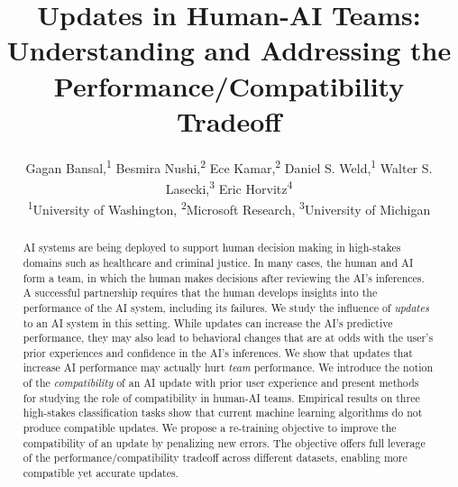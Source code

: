 \documentclass[letterpaper]{article} %
\title{Updates in Human-AI Teams:\\ Understanding and Addressing the Performance/Compatibility Tradeoff}
\author{
Gagan Bansal,\textsuperscript{\rm 1}
Besmira Nushi,\textsuperscript{\rm 2}
Ece Kamar,\textsuperscript{\rm 2}
Daniel S. Weld,\textsuperscript{\rm 1}
Walter S. Lasecki,\textsuperscript{\rm 3}
Eric Horvitz\textsuperscript{\rm 4}\\
\textsuperscript{\rm 1}University of Washington,
\textsuperscript{\rm 2}Microsoft Research,
\textsuperscript{\rm 3}University of Michigan
}
\newcommand{\?}{\mbox{?}}
\begin{document}
\maketitle

\begin{abstract}

AI systems are being deployed to support human decision making in high-stakes domains such as healthcare and criminal justice. In many cases, the human and AI form a team, in which the human makes decisions after reviewing the AI's inferences. A successful partnership requires that the human develops insights into the performance of the AI system, including its failures. We study the influence of {\em updates} to an AI system in this setting. While updates can increase the AI's predictive performance, they may also lead to behavioral changes that are at odds with the user's prior experiences and confidence in the AI's inferences. We show that updates that increase AI performance may actually hurt {\em team} performance. 
We introduce the notion of the {\em compatibility} of an AI update with prior user experience and present methods for studying the role of compatibility in human-AI teams. 
Empirical results on three high-stakes classification tasks show that current machine learning algorithms do not produce compatible updates. We propose a re-training objective to improve the compatibility of an update by penalizing new errors. The objective offers full leverage of the performance/compatibility tradeoff across different datasets, enabling more compatible yet accurate updates.





\end{abstract}
\end{document}
